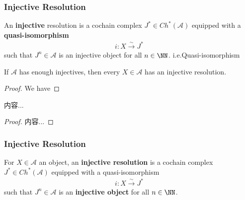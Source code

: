 \documentclass[Total.tex]{subfiles}
\begin{document}
					\subsubsection{Injective Resolution}
					\begin{Def}
						An \textbf{injective} resolution is a cochain complex $J^*\in Ch^*(\mathcal{A})$ equipped with a \textbf{quasi-isomorphism}
						\begin{gather*}
							i:X\stackrel{\sim}{\rightarrow} J^*
						\end{gather*}
						such that $J^n\in \mathcal{A}$ is an injective object for all $n\in \NN$. i.e.Quasi-isomorphism
						\begin{center}
						\end{center}
					\end{Def}
					
					\begin{proposition}
						If $\mathcal{A}$ has enough injectives, then every $X\in \mathcal{A}$ has an injective resolution. 
					\end{proposition}
					\begin{proof}
						We have
					\end{proof}
					
					\begin{proposition}
						内容...
					\end{proposition}
					\begin{proof}
						内容...
					\end{proof}	\subsubsection{Injective Resolution}
					\begin{Def}
					For $X\in \mathcal{A}$ an object, an \textbf{injective resolution} is a cochain complex $J^*\in Ch^*(\mathcal{A})$ equipped with a quasi-isomorphism
					\begin{gather*}
						i:X\stackrel{\sim}{\rightarrow} J^*
					\end{gather*}
					such that $J^n\in \mathcal{A}$ is an \textbf{injective object} for all $n\in \NN$.
					\end{Def}
					\begin{center}
					\end{center}
\end{document}
